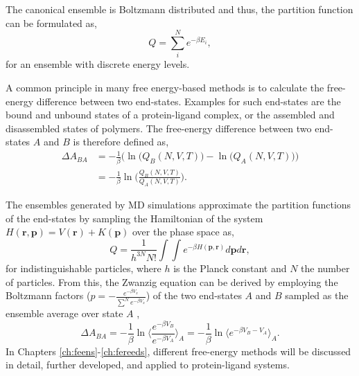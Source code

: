 The canonical ensemble is Boltzmann distributed \cite{Boltzmann1872} and thus, the partition function can be formulated as,
\begin{equation}
    Q =\sum^N_i e^{-\beta E_i} ,
\end{equation} 
for an ensemble with discrete energy levels.  \cite{Atkins2014}

A common principle in many free energy-based methods is to calculate the free-energy difference between two end-states. \cite{Ytreberg2006, Kirkwood1935, Zwanzig1954} Examples for such end-states are the bound and unbound states of a protein-ligand complex, or the assembled and disassembled states of polymers. \cite{Kollman1993, Armacost2020, Christ2009, Hansen2014, Cournia2020} 
%
The free-energy difference between two end-states $A$ and $B$ is therefore defined as,  \cite{Atkins2014}
\begin{equation}
    \begin{split}
        \Delta A_{BA} &= -\frac{1}{\beta} \bigg(\ln\big( Q_B(N, V, T) ) - \ln(Q_A(N, V, T)\big)\bigg)\\
        &= -\frac{1}{\beta} \ln\Bigg(\frac{Q_B(N, V, T)}{Q_A(N, V, T)}\Bigg).
    \end{split}
\end{equation}

The ensembles generated by MD simulations approximate the partition functions of the end-states by sampling the Hamiltonian of the system $H(\textbf{r},\textbf{p})=V(\textbf{r})+K(\textbf{p})$ over the phase space as,\cite{Allen2017} 
\begin{equation}
    Q = \frac{1}{h^{3N} N!}  \int \int e^{-\beta H(\textbf{p},\textbf{r})} d \textbf{p} d \textbf{r} ,
\end{equation}
for indistinguishable particles, where $h$ is the Planck constant and $N$ the number of particles.
%
From this, the Zwanzig equation\cite{Zwanzig1954} can be derived by employing the Boltzmann factors ($p=-\frac{e^{-\beta V_x}}{\sum^N e^{-\beta V_x}}$) of the two end-states $A$ and $B$ sampled as the ensemble average over state $A$ \cite{Zwanzig1954}, 
\begin{equation}
        \Delta A_{BA} 
        = -\frac{1}{\beta} \ln\Bigg\langle \frac{e^{-\beta V_B}}{e^{-\beta V_A}}\Bigg\rangle_A
        = -\frac{1}{\beta} \ln\Bigg\langle e^{-\beta V_B-V_A}\Bigg\rangle_A .
\end{equation}
In Chapters \ref{ch:feens}-\ref{ch:fereeds}, different free-energy methods will be discussed in detail, further developed, and applied to protein-ligand systems. 